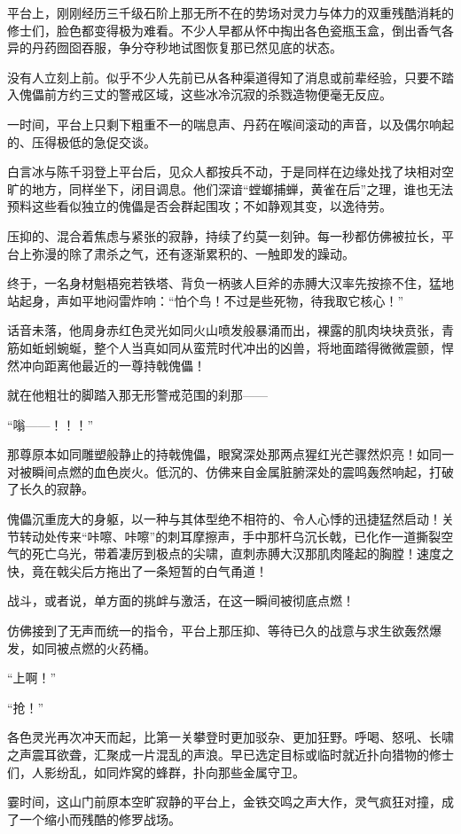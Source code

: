 平台上，刚刚经历三千级石阶上那无所不在的势场对灵力与体力的双重残酷消耗的修士们，脸色都变得极为难看。不少人早都从怀中掏出各色瓷瓶玉盒，倒出香气各异的丹药囫囵吞服，争分夺秒地试图恢复那已然见底的状态。

没有人立刻上前。似乎不少人先前已从各种渠道得知了消息或前辈经验，只要不踏入傀儡前方约三丈的警戒区域，这些冰冷沉寂的杀戮造物便毫无反应。

一时间，平台上只剩下粗重不一的喘息声、丹药在喉间滚动的声音，以及偶尔响起的、压得极低的急促交谈。

白言冰与陈千羽登上平台后，见众人都按兵不动，于是同样在边缘处找了块相对空旷的地方，同样坐下，闭目调息。他们深谙“螳螂捕蝉，黄雀在后”之理，谁也无法预料这些看似独立的傀儡是否会群起围攻；不如静观其变，以逸待劳。

压抑的、混合着焦虑与紧张的寂静，持续了约莫一刻钟。每一秒都仿佛被拉长，平台上弥漫的除了肃杀之气，还有逐渐累积的、一触即发的躁动。

终于，一名身材魁梧宛若铁塔、背负一柄骇人巨斧的赤膊大汉率先按捺不住，猛地站起身，声如平地闷雷炸响：“怕个鸟！不过是些死物，待我取它核心！”

话音未落，他周身赤红色灵光如同火山喷发般暴涌而出，裸露的肌肉块块贲张，青筋如蚯蚓蜿蜒，整个人当真如同从蛮荒时代冲出的凶兽，将地面踏得微微震颤，悍然冲向距离他最近的一尊持戟傀儡！

就在他粗壮的脚踏入那无形警戒范围的刹那——

“嗡——！！！”

那尊原本如同雕塑般静止的持戟傀儡，眼窝深处那两点猩红光芒骤然炽亮！如同一对被瞬间点燃的血色炭火。低沉的、仿佛来自金属脏腑深处的震鸣轰然响起，打破了长久的寂静。

傀儡沉重庞大的身躯，以一种与其体型绝不相符的、令人心悸的迅捷猛然启动！关节转动处传来“咔嚓、咔嚓”的刺耳摩擦声，手中那杆乌沉长戟，已化作一道撕裂空气的死亡乌光，带着凄厉到极点的尖啸，直刺赤膊大汉那肌肉隆起的胸膛！速度之快，竟在戟尖后方拖出了一条短暂的白气甬道！

战斗，或者说，单方面的挑衅与激活，在这一瞬间被彻底点燃！

仿佛接到了无声而统一的指令，平台上那压抑、等待已久的战意与求生欲轰然爆发，如同被点燃的火药桶。

“上啊！”

“抢！”

各色灵光再次冲天而起，比第一关攀登时更加驳杂、更加狂野。呼喝、怒吼、长啸之声震耳欲聋，汇聚成一片混乱的声浪。早已选定目标或临时就近扑向猎物的修士们，人影纷乱，如同炸窝的蜂群，扑向那些金属守卫。

霎时间，这山门前原本空旷寂静的平台上，金铁交鸣之声大作，灵气疯狂对撞，成了一个缩小而残酷的修罗战场。

